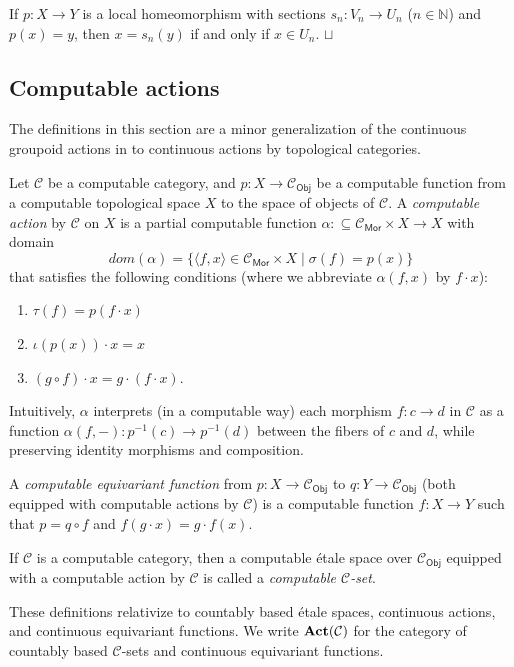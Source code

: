 \documentclass[envcountsame]{llncs}
\def\squareforqed{\hbox{\rlap{$\sqcap$}$\sqcup$}}
\def\qed{\ifmmode\squareforqed\else{\unskip\nobreak\hfil
\penalty50\hskip1em\null\nobreak\hfil\squareforqed
\parfillskip=0pt\finalhyphendemerits=0\endgraf}\fi}
\def\IN{{\mathbb N}}
\def\calC{{\mathcal{C}}}
\newcommand{\Mor}{\mathsf{Mor}}
\newcommand{\Obj}{\mathsf{Obj}}
\def\src{{\sigma}}
\def\tar{{\tau}}
\def\id{{\iota}}
\def\act{{\mathrm{\bold{Act}}}}
\begin{document}
\begin{lemma}\label{lem:sections}
If $p\colon X\to Y$ is a local homeomorphism with sections $s_n\colon V_n \to U_n$  ($n\in\IN$)  and $p(x)=y$, then $x=s_n(y)$ if and only if $x\in U_n$.
\qed
\end{lemma}


\subsection{Computable actions}

The definitions in this section are a minor generalization of the continuous groupoid actions in \cite{Chen19} to continuous actions by topological categories. 

Let $\calC$ be a computable category, and $p\colon X \to \calC_\Obj$ be a computable function from a computable topological space $X$ to the space of objects of $\calC$. A \emph{computable action} by $\calC$ on $X$ is a partial computable function $\alpha:\subseteq \calC_\Mor \times X \to X$ with domain
\[dom(\alpha) = \{\langle f,x\rangle \in \calC_\Mor \times X \mid \src(f) = p(x)\}\]
that satisfies the following conditions (where we abbreviate $\alpha(f,x)$ by $f\cdot x$):
\begin{enumerate}
\item
$\tar(f) = p(f\cdot x)$
\item
$\id(p(x)) \cdot x = x$
\item
$(g\circ f)\cdot x = g\cdot (f\cdot x)$.
\end{enumerate}

Intuitively, $\alpha$ interprets (in a computable way) each morphism $f\colon c \to d$ in $\calC$ as a function $\alpha(f,-) \colon p^{-1}(c) \to p^{-1}(d)$ between the fibers of $c$ and $d$, while preserving identity morphisms and composition.

A \emph{computable equivariant function} from $p\colon X \to \calC_\Obj$ to $q\colon Y \to \calC_\Obj$ (both equipped with computable actions by $\calC$) is a computable function $f\colon X\to Y$ such that $p = q\circ f$ and $f(g\cdot x) = g\cdot f(x)$.

If $\calC$ is a computable category, then a computable \'{e}tale space over $\calC_\Obj$ equipped with a computable action by $\calC$ is called a \emph{computable $\calC$-set}.

These definitions relativize to countably based \'{e}tale spaces, continuous actions, and continuous equivariant functions. We write $\act(\calC)$ for the category of countably based $\calC$-sets and continuous equivariant functions.
\end{document}
